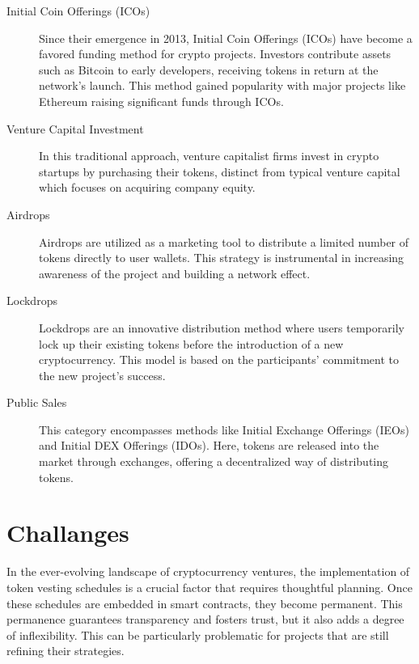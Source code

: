 \documentclass[12pt,oneside]{article}
\begin{document}
\begin{description}
  \item[Initial Coin Offerings (ICOs)]
  Since their emergence in 2013, Initial Coin Offerings (ICOs) have become a favored funding 
  method for crypto projects. Investors contribute assets such as Bitcoin to early developers, 
  receiving tokens in return at the network's launch. This method gained popularity with major projects 
  like Ethereum raising significant funds through ICOs.

  \item[Venture Capital Investment]
  In this traditional approach, venture capitalist firms invest in crypto startups by 
  purchasing their tokens, distinct from typical venture capital which focuses on acquiring company equity.

  \item[Airdrops]
  Airdrops are utilized as a marketing tool to distribute a limited number of 
  tokens directly to user wallets. This strategy is instrumental in increasing awareness 
  of the project and building a network effect.

  \item[Lockdrops]
  Lockdrops are an innovative distribution method where users temporarily lock up their existing 
  tokens before the introduction of a new cryptocurrency. This model is based on the participants' 
  commitment to the new project's success.

  \item[Public Sales]
  This category encompasses methods like Initial Exchange Offerings (IEOs) and Initial DEX Offerings
  (IDOs). Here, tokens are released into the market through exchanges, offering a decentralized way 
  of distributing tokens.
\end{description}


\section{Challanges}

In the ever-evolving landscape of cryptocurrency ventures, the implementation of token vesting schedules is 
a crucial factor that requires thoughtful planning. Once these schedules are embedded in smart contracts, 
they become permanent. This permanence guarantees transparency and fosters trust, but it also adds a degree 
of inflexibility. \cite{liu2022fighting} This can be particularly problematic for projects that are still refining their strategies. \cite{messias2023airdrops}
\end{document}

